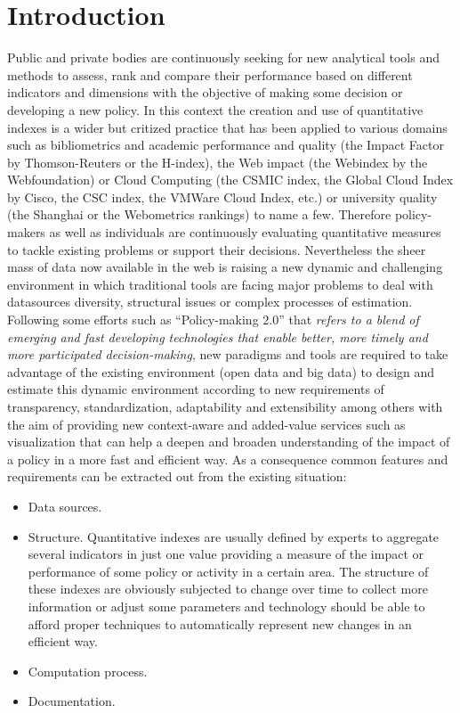 \documentclass{llncs}
\begin{document}
\section{Introduction}
Public and private bodies are continuously seeking for new analytical tools and methods to assess, rank and compare their performance based 
on different indicators and dimensions with the objective of making some decision or developing a new policy. 
In this context the creation and use of quantitative indexes is a wider but critized practice that has been applied to various 
domains such as bibliometrics and academic performance and quality (the Impact Factor by Thomson-Reuters or the H-index), 
the Web impact (the Webindex by the Webfoundation) or Cloud Computing (the CSMIC index, the Global Cloud Index by Cisco, the CSC index, 
the VMWare Cloud Index, etc.) or university quality (the Shanghai or the Webometrics rankings) to name a few. 
Therefore policy-makers as well as individuals are continuously evaluating quantitative measures to tackle 
existing problems or support their decisions. Nevertheless the sheer mass of data now available in the web is 
raising a new dynamic and challenging environment in which traditional tools are facing major 
problems to deal with datasources diversity, structural issues or complex processes of estimation. Following some efforts 
such as ``Policy-making $2.0$'' that \textit{refers to a blend of emerging and fast developing technologies 
that enable better, more timely and more participated decision-making}, new paradigms and tools are required to take advantage of 
the existing environment (open data and big data) to design and estimate this dynamic environment according to new requirements of 
transparency, standardization, adaptability and extensibility among others with the aim of providing new context-aware 
and added-value services such as visualization that can help a deepen and broaden understanding of the impact of a 
policy in a more fast and efficient way. As a consequence common features and requirements can be extracted out from the existing situation:
\begin{itemize}
 \item Data sources. 
 \item Structure. Quantitative indexes are usually defined by experts to aggregate several indicators in just one value providing a measure of the impact or 
 performance of some policy or activity in a certain area. The structure of these indexes are obviously subjected to change over time 
 to collect more information or adjust some parameters and technology should be able to afford proper techniques 
 to automatically represent new changes in an efficient way.
 
 \item Computation process. 
 \item Documentation.
\end{itemize}
\end{document}
